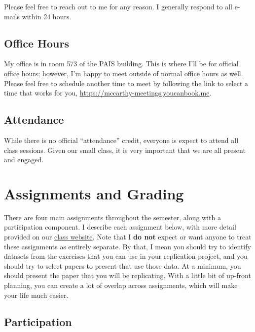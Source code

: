 \documentclass[11pt,]{article}
\begin{document}
Please feel free to reach out to me for any reason. I generally respond
to all e-mails within 24 hours.

\hypertarget{office-hours}{%
\subsection{Office Hours}\label{office-hours}}

My office is in room 573 of the PAIS building. This is where I'll be for
official office hours; however, I'm happy to meet outside of normal
office hours as well. Please feel free to schedule another time to meet
by following the link to select a time that works for you,
\url{https://mccarthy-meetings.youcanbook.me}.

\hypertarget{attendance}{%
\subsection{Attendance}\label{attendance}}

While there is no official ``attendance'' credit, everyone is expect to
attend all class sessions. Given our small class, it is very important
that we are all present and engaged.

\hypertarget{assignments-and-grading}{%
\section{Assignments and Grading}\label{assignments-and-grading}}

There are four main assignments throughout the semester, along with a
participation component. I describe each assignment below, with more
detail provided on our \href{https://imccart.github.io/Econ-771/}{class
website}. Note that I \textbf{do not} expect or want anyone to treat
these assignments as entirely separate. By that, I mean you should try
to identify datasets from the exercises that you can use in your
replication project, and you should try to select papers to present that
use those data. At a minimum, you should present the paper that you will
be replicating. With a little bit of up-front planning, you can create a
lot of overlap across assignments, which will make your life much
easier.

\hypertarget{participation}{%
\subsection{Participation}\label{participation}}
\end{document}
